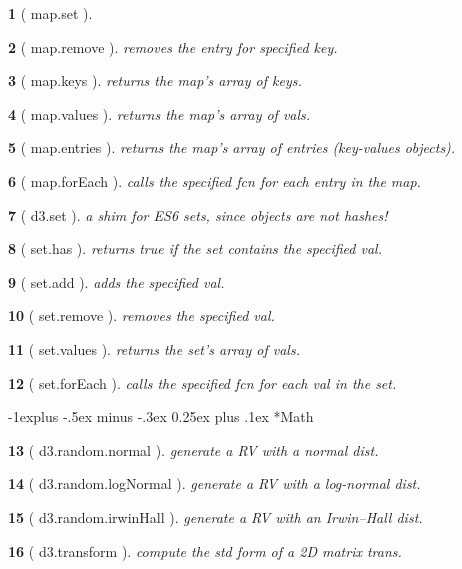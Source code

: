 \documentclass[10pt,landscape,letterpaper]{article}
\makeatletter
\newcounter{thm}
\newcommand{\hdrule}{\vspace{-4pt} \hdashrule[0.25ex]{\fill}{.5pt}{1pt}\vspace{-4pt}}
\theoremstyle{mytheoremstyle}
\newtheorem*{thm}{}
\renewcommand{\subsection}{\@startsection{subsection}{2}{0mm}%
                                {-1explus -.5ex minus -.3ex}%
                                {0.25ex plus .1ex}%
                                {\normalfont\normalsize\bfseries}}
\makeatother
\begin{document}
\begin{multicols}{3}
\begin{thm} [ map.set ]
\end{thm}\begin{thm} [ map.remove ]  removes the entry for specified key.
\end{thm}\begin{thm} [ map.keys ]  returns the map’s array of keys.
\end{thm}\begin{thm} [ map.values ]  returns the map’s array of vals.
\end{thm}\begin{thm} [ map.entries ]  returns the map’s array of entries (key-values objects).
\end{thm}\begin{thm} [ map.forEach ]  calls the specified fcn for each entry in the map.
\end{thm}\begin{thm} [ d3.set ]  a shim for ES6 sets, since objects are not hashes!
\end{thm}\begin{thm} [ set.has ]  returns true if the set contains the specified val.
\end{thm}\begin{thm} [ set.add ]  adds the specified val.
\end{thm}\begin{thm} [ set.remove ]  removes the specified val.
\end{thm}\begin{thm} [ set.values ]  returns the set’s array of vals.
\end{thm}\begin{thm} [ set.forEach ]  calls the specified fcn for each val in the set.\end{thm}
\hdrule
\subsection*{Math}

\begin{thm} [ d3.random.normal ]  generate a RV with a normal dist.
\end{thm}\begin{thm} [ d3.random.logNormal ]  generate a RV with a log-normal dist.
\end{thm}\begin{thm} [ d3.random.irwinHall ]  generate a RV with an Irwin–Hall dist.
\end{thm}\begin{thm} [ d3.transform ]  compute the std form of a 2D matrix trans.\end{thm}
\hdrule

\end{multicols}
\end{document}
